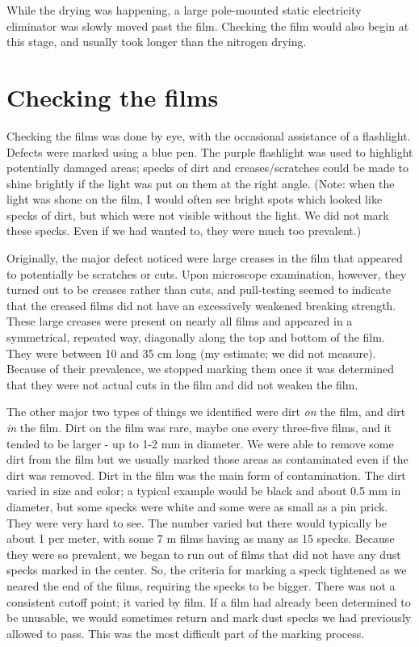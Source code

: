 \documentclass{article}
\begin{document}
While the drying was happening, a large pole-mounted static electricity eliminator was slowly moved past the film.  Checking the film would also begin at this stage, and usually took longer than the nitrogen drying. 

\section{Checking the films}
Checking the films was done by eye, with the occasional assistance of a flashlight. %
Defects were marked using a blue pen. The purple flashlight was used to highlight potentially damaged areas; specks of dirt and creases/scratches could be made to shine brightly if the light was put on them at the right angle.  (Note: when the light was shone on the film, I would often see bright spots which looked like specks of dirt, but which were not visible without the light. We did not mark these specks. Even if we had wanted to, they were much too prevalent.) 

 Originally, the major defect noticed were large creases in the film that appeared to potentially be scratches or cuts. Upon microscope examination, however, they turned out to be creases rather than cuts, and pull-testing seemed to indicate that the creased films did not have an excessively weakened breaking strength. 
These large creases were present on nearly all films and appeared in a symmetrical, repeated way, diagonally along the top and bottom of the film. They were between 10 and 35 cm long (my estimate; we did not measure).  Because of their prevalence, we stopped marking them once it was determined that they were not actual cuts in the film and did not weaken the film.

The other major two types of things we identified were dirt \emph{on} the film, and dirt \emph{in} the film.  Dirt on the film was rare, maybe one every three-five films, and it tended to be larger - up to 1-2 mm in diameter.  We were able to remove some dirt from the film but we usually marked those areas as contaminated even if the dirt was removed.  Dirt in the film was the main form of contamination. The dirt varied in size and color; a typical example would be black and about 0.5 mm in diameter, but some specks were white and some were as small as a pin prick. They were very hard to see. The number varied but there would typically be about 1 per meter, with some 7 m films having as many as 15 specks.  Because they were so prevalent, we began to run out of films that did not have any dust specks marked in the center. So, the criteria for marking a speck tightened as we neared the end of the films, requiring the specks to be bigger. There was not a consistent cutoff point; it varied by film. If a film had already been determined to be unusable, we would sometimes return and mark dust specks we had previously allowed to pass. This was the most difficult part of the marking process. 
\end{document}
